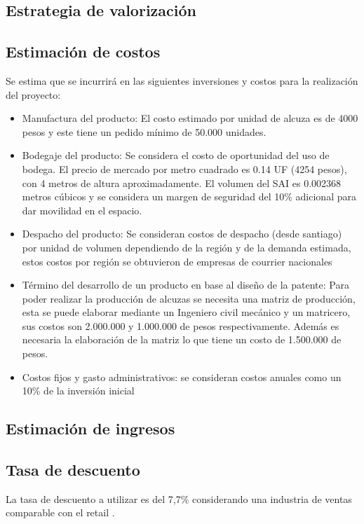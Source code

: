 \subsection{Estrategia de valorización}

\subsection{Estimación de costos}
Se estima que se incurrirá en las siguientes inversiones y costos para la realización del proyecto:
\begin{itemize}
  \item Manufactura del producto: El costo estimado por unidad de alcuza es de 4000 pesos y este tiene un pedido mínimo de 50.000 unidades.

  \item Bodegaje del producto: Se considera el costo de oportunidad del uso de bodega. El precio de mercado por metro cuadrado es 0.14 UF (4254 pesos), con 4 metros de altura aproximadamente. El volumen del SAI es 0.002368 metros cúbicos y se considera un margen de seguridad del 10\% adicional para dar movilidad en el espacio.

  \item Despacho del producto: Se consideran costos de despacho (desde santiago) por unidad de volumen dependiendo de la región y de la demanda estimada, estos costos por región se obtuvieron de empresas de courrier nacionales

  \item Término del desarrollo de un producto en base al diseño de la patente: Para poder realizar la producción de alcuzas se necesita una matriz de producción, esta se puede elaborar mediante un Ingeniero civil mecánico y un matricero, sus costos son 2.000.000 y 1.000.000 de pesos respectivamente. Además es necesaria la elaboración de la matriz lo que tiene un costo de 1.500.000 de pesos.

  \item Costos fijos y gasto administrativos: se consideran costos anuales como un 10\% de la inversión inicial
\end{itemize}



\subsection{Estimación de ingresos}


\subsection{Tasa de descuento}
La tasa de descuento a utilizar es del 7,7\% considerando una industria de ventas comparable con el retail \cite{security}.
